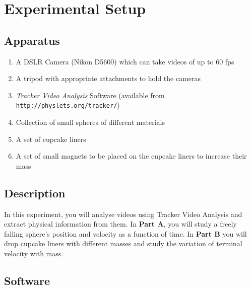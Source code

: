 




\section*{Experimental Setup}

\subsection*{Apparatus}

\begin{enumerate}[label=\arabic*)]
\itemsep0em
\item A DSLR Camera (Nikon D5600) which can take videos of up to 60 fps
\item A tripod with appropriate attachments to hold the cameras
\item \textsl{Tracker Video Analysis} Software (available from \nolinkurl{http://physlets.org/tracker/})
\item Collection of small spheres of different materials
\item A set of cupcake liners
\item A set of small magnets to be placed on the cupcake liners to increase their mass

\end{enumerate}

\subsection*{Description}

In this experiment, you will analyse videos using Tracker Video Analysis and extract physical information from them. In \textbf{Part A}, you will study a freely falling sphere's position and velocity as a function of time. In \textbf{Part B} you will drop cupcake liners with different masses and study the variation of terminal velocity with mass. 


\subsection*{Software}


